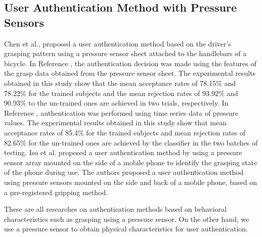 \documentclass[english,preprint,JIP]{ipsj}
\begin{document}
\subsection{User Authentication Method with Pressure Sensors}
Chen et al.\cite{driver_handgrip_1}, \cite{driver_handgrip_2} proposed a user authentication method based on the driver's grasping pattern using a pressure sensor sheet attached to the handlebars of a bicycle. In Reference \cite{driver_handgrip_1}, the authentication decision was made using the features of the grasp data obtained from the pressure sensor sheet. The experimental results obtained in this study show that the mean acceptance rates of 78.15\% and 78.22\% for the trained subjects and the mean rejection rates of 93.92\% and 90.93\% to the un-trained ones are achieved in two trials, respectively. In Reference \cite{driver_handgrip_2}, authentication was performed using time series data of pressure values. The experimental results obtained in this study show that mean acceptance rates of 85.4\% for the trained subjects and mean rejection rates of 82.65\% for the un-trained ones are achieved by the classifier in the two batches of testing. Iso et al.\cite{mobile_grip} proposed a user authentication method by using a pressure sensor array mounted on the side of a mobile phone to identify the grasping state of the phone during use. The authors proposed a user authentication method using pressure sensors mounted on the side and back of a mobile phone, based on a pre-registered gripping method\cite{murao_grip}.\par

These are all researches on authentication methods based on behavioral characteristics such as grasping using a pressure sensor. On the other hand, we use a pressure sensor to obtain physical characteristics for user authentication.
\end{document}
